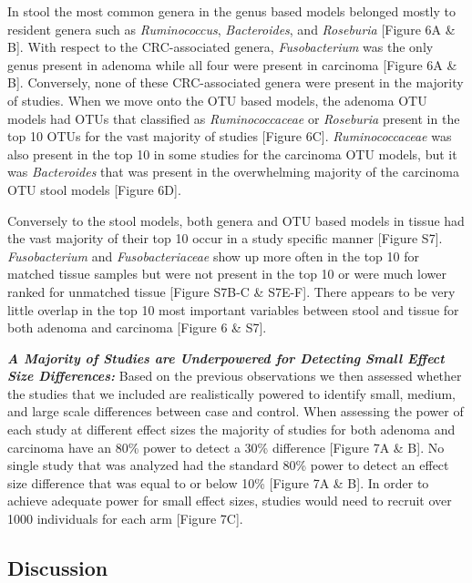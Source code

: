 \documentclass[12pt,]{article}
\begin{document}
In stool the most common genera in the genus based models belonged
mostly to resident genera such as \emph{Ruminococcus},
\emph{Bacteroides}, and \emph{Roseburia} {[}Figure 6A \& B{]}. With
respect to the CRC-associated genera, \emph{Fusobacterium} was the only
genus present in adenoma while all four were present in carcinoma
{[}Figure 6A \& B{]}. Conversely, none of these CRC-associated genera
were present in the majority of studies. When we move onto the OTU based
models, the adenoma OTU models had OTUs that classified as
\emph{Ruminococcaceae} or \emph{Roseburia} present in the top 10 OTUs
for the vast majority of studies {[}Figure 6C{]}. \emph{Ruminococcaceae}
was also present in the top 10 in some studies for the carcinoma OTU
models, but it was \emph{Bacteroides} that was present in the
overwhelming majority of the carcinoma OTU stool models {[}Figure 6D{]}.

Conversely to the stool models, both genera and OTU based models in
tissue had the vast majority of their top 10 occur in a study specific
manner {[}Figure S7{]}. \emph{Fusobacterium} and \emph{Fusobacteriaceae}
show up more often in the top 10 for matched tissue samples but were not
present in the top 10 or were much lower ranked for unmatched tissue
{[}Figure S7B-C \& S7E-F{]}. There appears to be very little overlap in
the top 10 most important variables between stool and tissue for both
adenoma and carcinoma {[}Figure 6 \& S7{]}.

\textbf{\emph{A Majority of Studies are Underpowered for Detecting Small
Effect Size Differences:}} Based on the previous observations we then
assessed whether the studies that we included are realistically powered
to identify small, medium, and large scale differences between case and
control. When assessing the power of each study at different effect
sizes the majority of studies for both adenoma and carcinoma have an
80\% power to detect a 30\% difference {[}Figure 7A \& B{]}. No single
study that was analyzed had the standard 80\% power to detect an effect
size difference that was equal to or below 10\% {[}Figure 7A \& B{]}. In
order to achieve adequate power for small effect sizes, studies would
need to recruit over 1000 individuals for each arm {[}Figure 7C{]}.

\newpage

\subsection{Discussion}\label{discussion}
\end{document}
